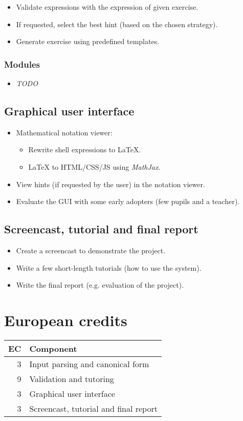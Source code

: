 \documentclass[10pt,a4paper]{article}
\begin{document}
\begin{itemize}
    \item Validate expressions with the expression of given exercise.
    \item If requested, select the best hint (based on the chosen strategy).
    \item Generate exercise using predefined templates.
\end{itemize}

\subsubsection{Modules}

\begin{itemize}
    \item \emph{TODO}
\end{itemize}

\subsection{Graphical user interface}

\begin{itemize}
    \item Mathematical notation viewer:
    \begin{itemize}
        \item Rewrite shell expressions to \LaTeX.
        \item \LaTeX $ $ to HTML/CSS/JS using \emph{MathJax}.
    \end{itemize}
    \item View hints (if requested by the user) in the notation viewer.
    \item Evaluate the GUI with some early adopters (few pupils and a teacher).
\end{itemize}

\subsection{Screencast, tutorial and final report}

\begin{itemize}
    \item Create a screencast to demonstrate the project.
    \item Write a few short-length tutorials (how to use the system).
    \item Write the final report (e.g. evaluation of the project).
\end{itemize}

\section{European credits}

\begin{tabular}{rl}
\toprule
EC & Component \\
\midrule
3  & Input parsing and canonical form \\
9  & Validation and tutoring \\
3  & Graphical user interface \\
3  & Screencast, tutorial and final report \\
\bottomrule
\end{tabular}
\end{document}
